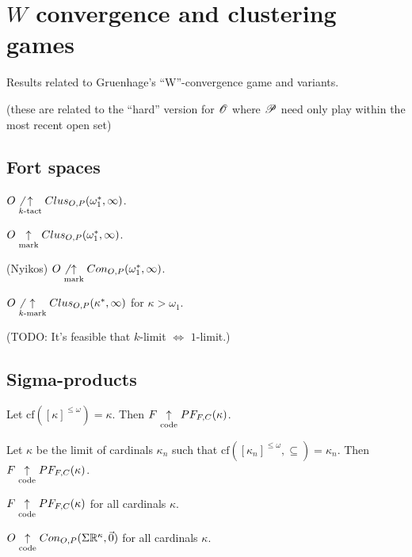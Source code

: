 
\chapter{$W$ convergence and clustering games}

Results related to Gruenhage's ``W''-convergence game and variants.

(these are related to the ``hard'' version for $\mathscr{O}$ where $\mathscr{P}$
need only play within the most recent open set)

\section{Fort spaces}

\begin{thm}
$O\not\underset{k\text{-tact}}{\uparrow}Clus_{O,P}(\omega_1^*,\infty)$.
\end{thm}

\begin{thm}
$O\underset{\text{mark}}{\uparrow} Clus_{O,P}(\omega_1^*,\infty)$.
\end{thm}

\begin{thm}(Nyikos)
$O\not\underset{\text{mark}}{\uparrow} Con_{O,P}(\omega_1^*,\infty)$.
\end{thm}

\begin{thm}
$O\not\underset{k\text{-mark}}{\uparrow}Clus_{O,P}(\kappa^*,\infty)$ for $\kappa>\omega_1$.
\end{thm}

(TODO: It's feasible that $k$-limit $\Leftrightarrow$ $1$-limit.)

\section{Sigma-products}

\begin{thm}
  Let $\textrm{cf}([\kappa]^{\leq\omega})=\kappa$.
  Then $F \underset{\text{code}}{\uparrow} PF_{F,C}(\kappa)$.
\end{thm}

\begin{thm}
  Let $\kappa$ be the limit of cardinals $\kappa_n$ such that
  $\textrm{cf}([\kappa_n]^{\leq\omega},\subseteq)=\kappa_n$.
  Then $F \underset{\text{code}}{\uparrow} PF_{F,C}(\kappa)$.
\end{thm}

\begin{thm}
  $F\underset{\text{code}}{\uparrow}PF_{F,C}(\kappa)$ for all cardinals $\kappa$.
\end{thm}

\begin{cor}
  $O\underset{\text{code}}{\uparrow}Con_{O,P}(\Sigma\mathbb{R}^{\kappa},\vec{0})$
  for all cardinals $\kappa$.
\end{cor}
